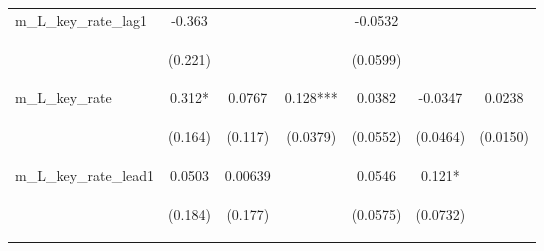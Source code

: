 \documentclass[]{article}
\begin{document}
\begin{center}
\begin{tabular}{lcccccc}
m\_L\_key\_rate\_lag1 & -0.363 &  &  & -0.0532 &  &  \\
\vspace{4pt} & \begin{footnotesize}(0.221)\end{footnotesize} & \begin{footnotesize}\end{footnotesize} & \begin{footnotesize}\end{footnotesize} & \begin{footnotesize}(0.0599)\end{footnotesize} & \begin{footnotesize}\end{footnotesize} & \begin{footnotesize}\end{footnotesize} \\
m\_L\_key\_rate & 0.312* & 0.0767 & 0.128*** & 0.0382 & -0.0347 & 0.0238 \\
\vspace{4pt} & \begin{footnotesize}(0.164)\end{footnotesize} & \begin{footnotesize}(0.117)\end{footnotesize} & \begin{footnotesize}(0.0379)\end{footnotesize} & \begin{footnotesize}(0.0552)\end{footnotesize} & \begin{footnotesize}(0.0464)\end{footnotesize} & \begin{footnotesize}(0.0150)\end{footnotesize} \\
m\_L\_key\_rate\_lead1 & 0.0503 & 0.00639 &  & 0.0546 & 0.121* &  \\
\vspace{4pt} & \begin{footnotesize}(0.184)\end{footnotesize} & \begin{footnotesize}(0.177)\end{footnotesize} & \begin{footnotesize}\end{footnotesize} & \begin{footnotesize}(0.0575)\end{footnotesize} & \begin{footnotesize}(0.0732)\end{footnotesize} & \begin{footnotesize}\end{footnotesize} \\

\end{tabular}
\end{center}
\end{document}
